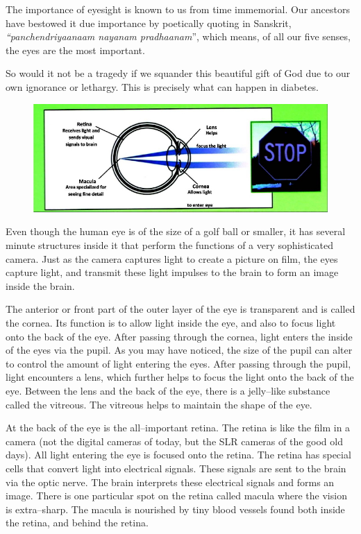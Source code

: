 The importance of eyesight is known to us from time immemorial. Our ancestors have bestowed it due importance by poetically quoting in Sanskrit, \textit{“panchendriyaanaam nayanam pradhaanam}”, which means, of all our five senses, the eyes are the most important.

So would it not be a tragedy if we squander this beautiful gift of God due to our own ignorance or lethargy. This is precisely what can happen in diabetes.


\begin{figure}
\includegraphics{images/049.jpg}
\end{figure}

Even though the human eye is of the size of a golf ball or smaller, it has several minute structures inside it that perform the functions of a very sophisticated camera. Just as the camera captures light to create a picture on film, the eyes capture light, and transmit these light impulses to the brain to form an image inside the brain.

The anterior or front part of the outer layer of the eye is transparent and is called the cornea. Its function is to allow light inside the eye, and also to focus light onto the back of the eye. After passing through the cornea, light enters the inside of the eyes via the pupil. As you may have noticed, the size of the pupil can alter to control the amount of light entering the eyes. After passing through the pupil, light encounters a lens, which further helps to focus the light onto the back of the eye. Between the lens and the back of the eye, there is a jelly–like substance called the vitreous. The vitreous helps to maintain the shape of the eye.

At the back of the eye is the all–important retina. The retina is like the film in a camera (not the digital cameras of today, but the SLR cameras of the good old days). All light entering the eye is focused onto the retina. The retina has special cells that convert light into electrical signals. These signals are sent to the brain via the optic nerve. The brain interprets these electrical signals and forms an image. There is one particular spot on the retina called macula where the vision is extra–sharp. The macula is nourished by tiny blood vessels found both inside the retina, and behind the retina.

